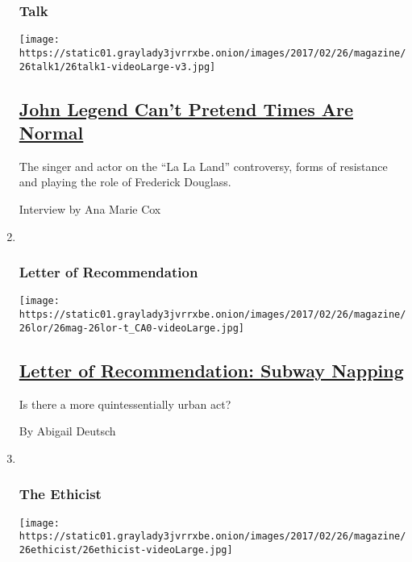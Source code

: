 \begin{enumerate}
{  \subsubsection{Talk}\label{talk}}

  \texttt{[image: https://static01.graylady3jvrrxbe.onion/images/2017/02/26/magazine/26talk1/26talk1-videoLarge-v3.jpg]}

  \hypertarget{john-legend-cant-pretend-times-are-normal}{%
  \subsection{\texorpdfstring{\href{/2017/02/21/magazine/john-legend-cant-pretend-times-are-normal.html}{John
  Legend Can't Pretend Times Are
  Normal}}{John Legend Can't Pretend Times Are Normal}}\label{john-legend-cant-pretend-times-are-normal}}

  The singer and actor on the ``La La Land'' controversy, forms of
  resistance and playing the role of Frederick Douglass.

  Interview by Ana Marie Cox
\item ~
  \hypertarget{letter-of-recommendation}{%
  \subsubsection{Letter of
  Recommendation}\label{letter-of-recommendation}}

  \texttt{[image: https://static01.graylady3jvrrxbe.onion/images/2017/02/26/magazine/26lor/26mag-26lor-t\_CA0-videoLarge.jpg]}

  \hypertarget{letter-of-recommendation-subway-napping}{%
  \subsection{\texorpdfstring{\href{/2017/02/22/magazine/letter-of-recommendation-subway-napping.html}{Letter
  of Recommendation: Subway
  Napping}}{Letter of Recommendation: Subway Napping}}\label{letter-of-recommendation-subway-napping}}

  Is there a more quintessentially urban act?

  By Abigail Deutsch
\item ~
  \hypertarget{the-ethicist}{%
  \subsubsection{The Ethicist}\label{the-ethicist}}

  \texttt{[image: https://static01.graylady3jvrrxbe.onion/images/2017/02/26/magazine/26ethicist/26ethicist-videoLarge.jpg]}


\end{enumerate}
